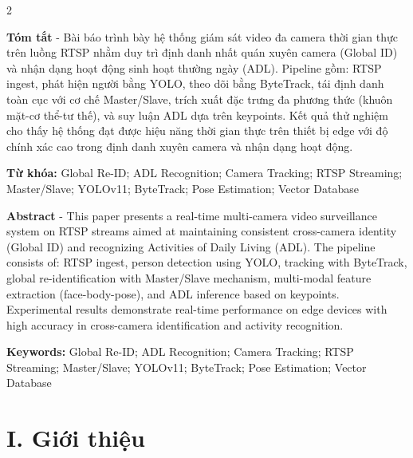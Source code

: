 \documentclass[a4paper,13pt]{article}
\begin{document}
\begin{multicols}{2}
\fontsize{13}{15.6}\selectfont

\noindent\textbf{Tóm tắt} - Bài báo trình bày hệ thống giám sát video đa camera thời gian thực trên luồng RTSP nhằm duy trì định danh nhất quán xuyên camera (Global ID) và nhận dạng hoạt động sinh hoạt thường ngày (ADL). Pipeline gồm: RTSP ingest, phát hiện người bằng YOLO, theo dõi bằng ByteTrack, tái định danh toàn cục với cơ chế Master/Slave, trích xuất đặc trưng đa phương thức (khuôn mặt-cơ thể-tư thế), và suy luận ADL dựa trên keypoints. Kết quả thử nghiệm cho thấy hệ thống đạt được hiệu năng thời gian thực trên thiết bị edge với độ chính xác cao trong định danh xuyên camera và nhận dạng hoạt động.

\textbf{Từ khóa:} Global Re-ID; ADL Recognition; Camera Tracking; RTSP Streaming; Master/Slave; YOLOv11; ByteTrack; Pose Estimation; Vector Database

\vspace{0.5cm}

\noindent\textbf{Abstract} - This paper presents a real-time multi-camera video surveillance system on RTSP streams aimed at maintaining consistent cross-camera identity (Global ID) and recognizing Activities of Daily Living (ADL). The pipeline consists of: RTSP ingest, person detection using YOLO, tracking with ByteTrack, global re-identification with Master/Slave mechanism, multi-modal feature extraction (face-body-pose), and ADL inference based on keypoints. Experimental results demonstrate real-time performance on edge devices with high accuracy in cross-camera identification and activity recognition.

\textbf{Keywords:} Global Re-ID; ADL Recognition; Camera Tracking; RTSP Streaming; Master/Slave; YOLOv11; ByteTrack; Pose Estimation; Vector Database

\vspace{1cm}

\section*{I. Giới thiệu}


\end{multicols}
\end{document}
